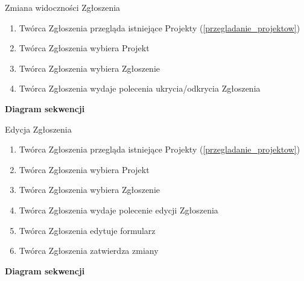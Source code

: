 \begin{usecase}{Zmiana widoczności Zgłoszenia}
	\begin{enumerate}
    \item Twórca Zgłoszenia przegląda istniejące Projekty (\ref{przegladanie_projektow})
    \item Twórca Zgłoszenia wybiera Projekt
    \item Twórca Zgłoszenia wybiera Zgłoszenie
    \item Twórca Zgłoszenia wydaje polecenia ukrycia/odkrycia Zgłoszenia
	\end{enumerate}
	\parindent=0cm
	\textbf{Diagram sekwencji}
\end{usecase}


\begin{usecase}{Edycja Zgłoszenia}
\label{edycja_zgloszenia}
	\begin{enumerate}
	\item Twórca Zgłoszenia przegląda istniejące Projekty (\ref{przegladanie_projektow})
    \item Twórca Zgłoszenia wybiera Projekt
    \item Twórca Zgłoszenia wybiera Zgłoszenie
    \item Twórca Zgłoszenia wydaje polecenie edycji Zgłoszenia
    \item Twórca Zgłoszenia edytuje formularz
    \item Twórca Zgłoszenia zatwierdza zmiany
	\end{enumerate}
	\parindent=0cm
	\textbf{Diagram sekwencji}
\end{usecase}


